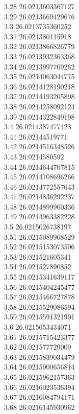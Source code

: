 {3.28	26.0213603367127\\
3.29	26.0213669429676\\
3.3	26.0213735360252\\
3.31	26.021380115918\\
3.32	26.0213866826779\\
3.33	26.0213932363368\\
3.34	26.0213997769262\\
3.35	26.0214063044775\\
3.36	26.0214128190218\\
3.37	26.0214193205898\\
3.38	26.0214258092124\\
3.39	26.0214322849198\\
3.4	26.0214387477423\\
3.41	26.02144519771\\
3.42	26.0214516348526\\
3.43	26.0214580592\\
3.44	26.0214644707815\\
3.45	26.0214708696266\\
3.46	26.0214772557643\\
3.47	26.0214836292237\\
3.48	26.0214899900336\\
3.49	26.0214963382228\\
3.5	26.0215026738197\\
3.51	26.0215089968529\\
3.52	26.0215153073506\\
3.53	26.021521605341\\
3.54	26.021527890852\\
3.55	26.0215341639117\\
3.56	26.0215404245477\\
3.57	26.0215466727878\\
3.58	26.0215529086594\\
3.59	26.0215591321901\\
3.6	26.0215653434071\\
3.61	26.0215715423377\\
3.62	26.021577729009\\
3.63	26.0215839034479\\
3.64	26.0215900656814\\
3.65	26.0215962157363\\
3.66	26.0216023536394\\
3.67	26.0216084794171\\
3.68	26.0216145930962\\
}
